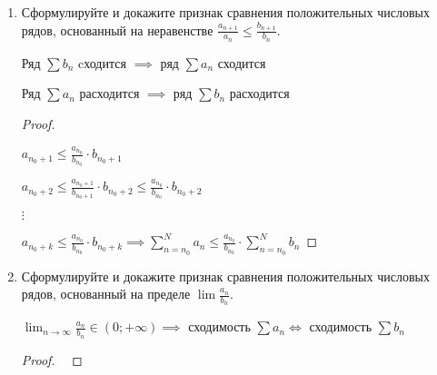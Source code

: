 \documentclass[a4paper]{article}
\begin{document}
\begin{enumerate}
        $a_n \leqslant b_n$ при всех $n \geqslant n_0$
	
	    Ряд $\sum b_n$ cходится $\implies$ ряд $\sum a_n$ сходится
	
        Ряд $\sum a_n$ расходится $\implies$ ряд $\sum b_n$ расходится
        
        \begin{proof}
        	На основании того, что отбрасывание конечного числа элементов ряда не отражается на его поведении, мы можем считать, что $a_n \leqslant b_n$ при всех $n = 1, 2, 3, \dots$ Обозначив частные суммы через $A$ и $B$ соответственно, имеем $A_n \leqslant B_n$. Пусть ряд $\sum b_n$ сходится, тогда $B_n$ ограничена, $B_n \leqslant S (S = const, n = 1, 2, 3, \cdots)$. В таком случае $A_n$ также меньше либо равна некоторому $S$, что даёт нам ограниченность $\sum a_n$.
        \end{proof}
    
        \item Сформулируйте и докажите признак сравнения положительных числовых рядов, основанный на неравенстве $\frac{a_{n+1}}{a_n} \leqslant \frac{b_{n+1}}{b_n}$.
        
        Ряд $\sum b_n$ cходится $\implies$ ряд $\sum a_n$ сходится
	
        Ряд $\sum a_n$ расходится $\implies$ ряд $\sum b_n$ расходится
        
        \begin{proof}~
        
        $a_{n_0+1} \leqslant \frac{a_{n_0}}{b_{n_0}}\cdot b_{n_0 + 1}$
        
        $a_{n_0+2} \leqslant \frac{a_{n_0 + 1}}{b_{n_0 + 1}}\cdot b_{n_0 + 2} \leqslant \frac{a_{n_0}}{b_{n_0}}\cdot b_{n_0 + 2}$
        
        $\vdots$
        
        $a_{n_0+k} \leqslant \frac{a_{n_0}}{b_{n_0}}\cdot b_{n_0 + k} \implies \sum_{n=n_0}^{N} a_n \leqslant \frac{a_{n_0}}{b_{n_0}}\cdot \sum_{n=n_0}^{N} b_n$
        \end{proof}

        \item Сформулируйте и докажите признак сравнения положительных числовых рядов, основанный на пределе $\lim \frac{a_n}{b_n}$.
        
        $\lim_{n \to \infty} \frac{a_n}{b_n} \in (0; +\infty) \implies$ сходимость $\sum a_n \iff$ сходимость $\sum b_n$
        
        \begin{proof}~
            

\end{proof}
\end{enumerate}
\end{document}
